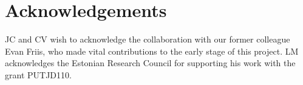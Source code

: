 \section*{Acknowledgements}

JC and CV wish to acknowledge the collaboration with our former colleague Evan Friis,
who made vital contributions to the early stage of this project. LM acknowledges the Estonian Research Council for supporting his work with the grant PUTJD110. 
